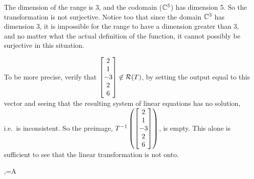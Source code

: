 {}
%
{The dimension of the range is 3, and the codomain (${\mathbb C}\sp{5}$) has dimension 5.  So the transformation is not surjective.  Notice too that since the domain ${\mathbb C}\sp{3}$ has dimension 3, it is impossible for the range to have a dimension greater than 3, and no matter what the actual definition of the function, it cannot possibly be surjective in this situation.\par
%
To be more precise, verify that $\begin{bmatrix}2\\1\\-3\\2\\6\end{bmatrix}\not\in\mathcal{R}\!\protect\left(T\protect\right)$, by setting the output equal to this vector and seeing that the resulting system of linear equations has no solution, i.e.\ is inconsistent.  So the preimage, $T\sp{-1}\protect\left(\begin{bmatrix}2\\1\\-3\\2\\6\end{bmatrix}\protect\right)$, is empty.  This alone is sufficient to see that the linear transformation is not onto.
}
%
%
%
\ltmatrixrepresentation
{,\quad{}=A}
{}
%
\newpage
%
%
%
%
%
%
%
%
